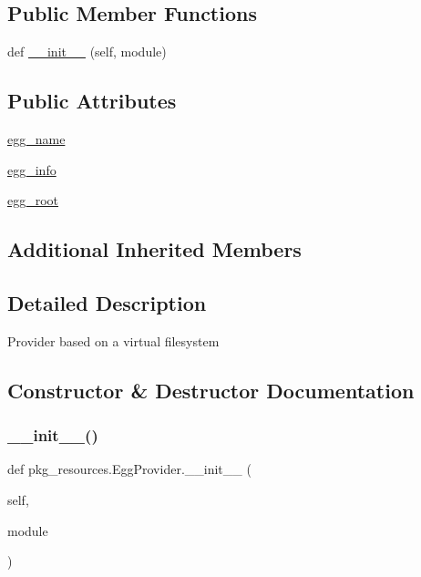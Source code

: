 \subsection*{Public Member Functions}
\begin{DoxyCompactItemize}
\item 
def \hyperlink{classpkg__resources_1_1EggProvider_a14a5f9785343ac3b25f469ddb6358e65}{\+\_\+\+\_\+init\+\_\+\+\_\+} (self, module)
\end{DoxyCompactItemize}
\subsection*{Public Attributes}
\begin{DoxyCompactItemize}
\item 
\hyperlink{classpkg__resources_1_1EggProvider_a3ad4e46d4d17d838fa87cd90c9ae5356}{egg\+\_\+name}
\item 
\hyperlink{classpkg__resources_1_1EggProvider_aaf8024857e8194457b41b0a70b76fe02}{egg\+\_\+info}
\item 
\hyperlink{classpkg__resources_1_1EggProvider_a4f493d581c0d65f2d2960d9594138f24}{egg\+\_\+root}
\end{DoxyCompactItemize}
\subsection*{Additional Inherited Members}


\subsection{Detailed Description}
\begin{DoxyVerb}Provider based on a virtual filesystem\end{DoxyVerb}
 

\subsection{Constructor \& Destructor Documentation}
\mbox{\label{classpkg__resources_1_1EggProvider_a14a5f9785343ac3b25f469ddb6358e65}} 
\subsubsection{\texorpdfstring{\+\_\+\+\_\+init\+\_\+\+\_\+()}{\_\_init\_\_()}}
{\footnotesize\ttfamily def pkg\+\_\+resources.\+Egg\+Provider.\+\_\+\+\_\+init\+\_\+\+\_\+ (\begin{DoxyParamCaption}\item[{}]{self,  }\item[{}]{module }\end{DoxyParamCaption})}



